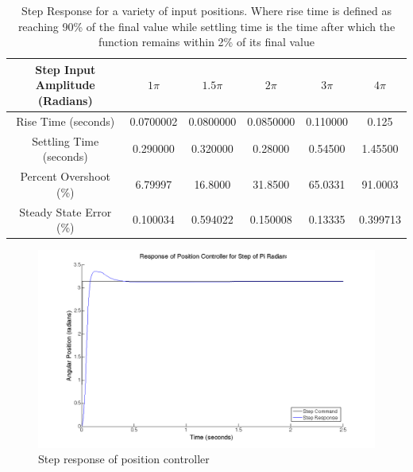 \documentclass{article}
\theoremstyle{plain}
\theoremstyle{definition}
\theoremstyle{remark}
\begin{document}
\begin{table}[htb]
\begin{center}
    \begin{tabular}{|c|c|c|c|c|c|}
        \hline
        Step Input Amplitude (Radians) & $1\pi$   & $1.5 \pi$ & $2\pi$   & $3\pi$   & $4\pi$   \\ \hline
        Rise Time (seconds)            & 0.0700002 & 0.0800000   & 0.0850000 & 0.110000 & 0.125    \\ 
        Settling Time (seconds)        & 0.290000   & 0.320000    & 0.28000   & 0.54500  & 1.45500  \\ 
        Percent Overshoot (\%)          & 6.79997   & 16.8000     & 31.8500   & 65.0331  & 91.0003  \\ 
        Steady State Error (\%)         & 0.100034  & 0.594022    & 0.150008  & 0.13335  & 0.399713 \\
        \hline
    \end{tabular}
\end{center}
\caption{Step Response for a variety of input positions.  Where rise time is defined as reaching 90\% of the final value while settling time is the time after which the function remains within 2\% of its final value}
\label{q5_b6}
\end{table}

\begin{figure}
\begin{center}
\includegraphics[width = 14cm]{posstep_1pi.png}
\caption{Step response of position controller}
\label{q5_b1}
\end{center}
\end{figure}
\end{document}
